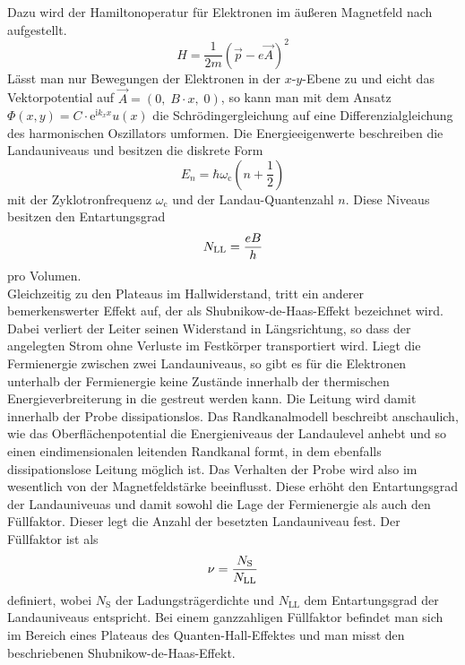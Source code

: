 \documentclass[paper=a4,fontsize=10pt,DIV=18,twocolumn,parskip=half]{scrartcl}
\numberwithin{equation}{section}    %
\begin{document}
Dazu wird der Hamiltonoperatur für Elektronen im äußeren Magnetfeld nach \citet{batke} aufgestellt.
\begin{equation}
H=\frac{1}{2 m} \left(\vec{p} - e \vec{A}\right)^2
\end{equation}
Lässt man nur Bewegungen der Elektronen in der $x$-$y$-Ebene zu und eicht das Vektorpotential auf  $\vec{A}= (0, \; B\cdot x, \; 0)$, so kann man mit dem Ansatz $\Phi(x,y)=C \cdot \mathrm{e}^{\mathrm{i} k_x x} u(x)$ die Schrödingergleichung auf eine Differenzialgleichung des harmonischen Oszillators umformen.
Die Energieeigenwerte beschreiben die Landauniveaus und besitzen die diskrete Form
\begin{equation}
E_n=\hbar \omega_\mathrm{c} \left(n+\frac{1}{2}\right)
\end{equation}
mit der Zyklotronfrequenz $\omega_\mathrm{c}$ und der Landau-Quantenzahl $n$. Diese Niveaus besitzen den Entartungsgrad
\begin{equation}
N_{\rm LL}= \frac{e B}{h}
\label{entartung}
\end{equation}
pro Volumen.  \\
Gleichzeitig zu den Plateaus im Hallwiderstand, tritt ein anderer bemerkenswerter Effekt auf, der als Shubnikow-de-Haas-Effekt bezeichnet wird. Dabei verliert der Leiter seinen Widerstand in Längsrichtung, so dass der angelegten Strom ohne Verluste im Festkörper transportiert wird. Liegt die Fermienergie zwischen zwei Landauniveaus, so gibt es für die Elektronen unterhalb der Fermienergie keine Zustände innerhalb der thermischen Energieverbreiterung in die gestreut werden kann. Die Leitung wird damit innerhalb der Probe dissipationslos. Das Randkanalmodell beschreibt anschaulich, wie das Oberflächenpotential die Energieniveaus der Landaulevel anhebt und so einen eindimensionalen leitenden Randkanal formt, in dem ebenfalls dissipationslose Leitung möglich ist.
Das Verhalten der Probe wird also im wesentlich von der Magnetfeldstärke beeinflusst. Diese erhöht den Entartungsgrad der Landauniveuas  und damit sowohl die Lage der Fermienergie als auch den Füllfaktor. Dieser legt die Anzahl der besetzten Landauniveau fest. Der Füllfaktor ist als
\begin{equation}
\nu=\frac{N_\mathrm{S}}{N_{\rm LL}}
\label{fuellfaktor}
\end{equation}
definiert, wobei $N_\mathrm{S}$ der Ladungsträgerdichte und $N_{\mathrm{LL}}$ dem Entartungsgrad der Landauniveaus entspricht. Bei einem ganzzahligen Füllfaktor befindet man sich im Bereich eines Plateaus des Quanten-Hall-Effektes und man misst den beschriebenen Shubnikow-de-Haas-Effekt.\\
\end{document}
